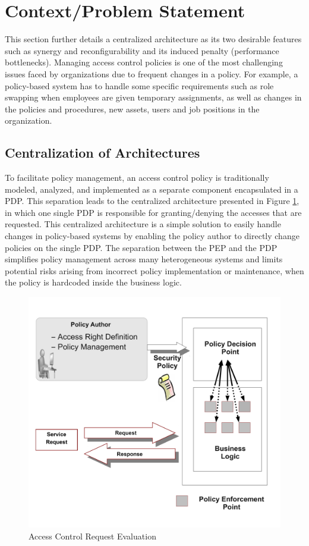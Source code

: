 
\section{Context/Problem Statement} \label{sec:context}
This section further details a centralized architecture as its two desirable features such as synergy and reconfigurability and its induced penalty (performance bottlenecks). 
Managing access control policies is one of the most challenging issues faced by organizations due to frequent changes in a policy. For example, a policy-based system has 
to handle some specific requirements such as role swapping when employees are given temporary assignments, as well as changes in the policies and procedures, new assets, users and job positions in the organization.
\subsection{Centralization of Architectures}
To facilitate policy management, an access control policy is traditionally modeled, analyzed, and implemented as a separate component encapsulated in a PDP. This separation leads to the 
centralized architecture presented in Figure \ref{pep-pdp}, in which one single PDP is responsible for granting/denying the accesses that are requested. 
This centralized architecture is a simple solution to easily handle changes in policy-based systems by enabling the policy author 
to directly change policies on the single PDP. The separation between the PEP and the PDP simplifies policy management across many heterogeneous systems and limits
potential risks arising from incorrect policy implementation or maintenance, when the policy is hardcoded inside the business logic.
\begin{figure}[!h]
\begin{center}
\includegraphics[scale=0.38]{business-logic}
\caption{Access Control Request Evaluation}
\label{pep-pdp}
\end{center}
\end{figure}
